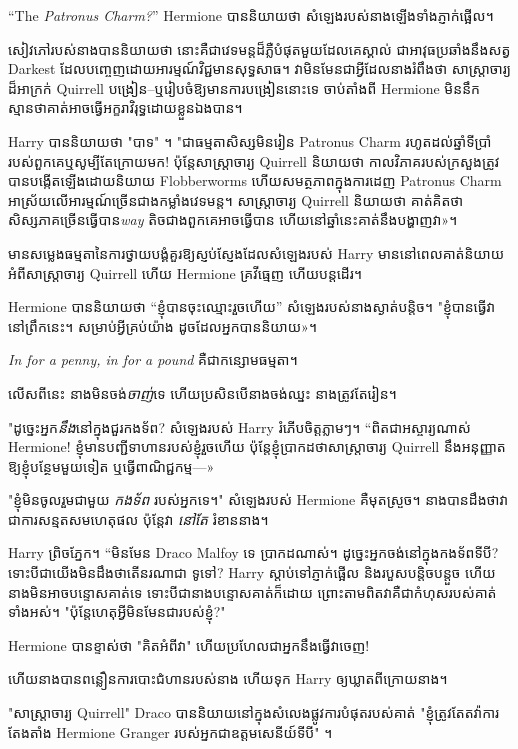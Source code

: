 {“The \emph{Patronus Charm?}” Hermione បាននិយាយថា សំឡេងរបស់នាងឡើងទាំងភ្ញាក់ផ្អើល។

សៀវភៅរបស់នាងបាននិយាយថា នោះគឺជាវេទមន្តដ៏ភ្លឺបំផុតមួយដែលគេស្គាល់ ជាអាវុធប្រឆាំងនឹងសត្វ Darkest ដែលបញ្ចេញដោយអារម្មណ៍វិជ្ជមានសុទ្ធសាធ។ វាមិនមែនជាអ្វីដែលនាងរំពឹងថា សាស្រ្តាចារ្យដ៏អាក្រក់ Quirrell បង្រៀន--ឬរៀបចំឱ្យមានការបង្រៀននោះទេ ចាប់តាំងពី Hermione មិននឹកស្មានថាគាត់អាចធ្វើអក្ខរាវិរុទ្ធដោយខ្លួនឯងបាន។

Harry បាននិយាយថា "បាទ" ។ "ជាធម្មតាសិស្សមិនរៀន Patronus Charm រហូតដល់ឆ្នាំទីប្រាំរបស់ពួកគេឬសូម្បីតែក្រោយមក! ប៉ុន្តែសាស្ត្រាចារ្យ Quirrell និយាយថា កាលវិភាគរបស់ក្រសួងត្រូវបានបង្កើតឡើងដោយនិយាយ Flobberworms ហើយសមត្ថភាពក្នុងការដេញ Patronus Charm អាស្រ័យលើអារម្មណ៍ច្រើនជាងកម្លាំងវេទមន្ត។ សាស្ត្រាចារ្យ Quirrell និយាយថា គាត់គិតថាសិស្សភាគច្រើនធ្វើបាន\emph{way} តិចជាងពួកគេអាចធ្វើបាន ហើយនៅឆ្នាំនេះគាត់នឹងបង្ហាញវា»។

មានសម្លេងធម្មតានៃការថ្វាយបង្គំគួរឱ្យស្ញប់ស្ញែងដែលសំឡេងរបស់ Harry មាននៅពេលគាត់និយាយអំពីសាស្រ្តាចារ្យ Quirrell ហើយ Hermione គ្រវីធ្មេញ ហើយបន្តដើរ។

Hermione បាននិយាយថា “ខ្ញុំបានចុះឈ្មោះរួចហើយ” សំឡេងរបស់នាងស្ងាត់បន្តិច។ "ខ្ញុំបានធ្វើវានៅព្រឹកនេះ។ សម្រាប់​អ្វី​គ្រប់​យ៉ាង ដូច​ដែល​អ្នក​បាន​និយាយ»។

\emph{In for a penny, in for a pound} គឺជាកន្សោមធម្មតា។

លើសពីនេះ នាងមិនចង់\emph{ចាញ់}ទេ ហើយប្រសិនបើនាងចង់ឈ្នះ នាងត្រូវតែរៀន។

"ដូច្នេះអ្នក\emph{នឹង}នៅក្នុងជួរកងទ័ព? សំឡេង​របស់ Harry រំភើប​ចិត្ត​ភ្លាមៗ។ “ពិតជាអស្ចារ្យណាស់ Hermione! ខ្ញុំ​មាន​បញ្ជី​ទាហាន​របស់​ខ្ញុំ​រួច​ហើយ ប៉ុន្តែ​ខ្ញុំ​ប្រាកដ​ថា​សាស្ត្រាចារ្យ Quirrell នឹង​អនុញ្ញាត​ឱ្យ​ខ្ញុំ​បន្ថែម​មួយ​ទៀត ឬ​ធ្វើ​ពាណិជ្ជកម្ម—»

"ខ្ញុំមិនចូលរួមជាមួយ \emph{ កងទ័ព} របស់អ្នកទេ។" សំឡេងរបស់ Hermione គឺមុតស្រួច។ នាង​បាន​ដឹង​ថា​វា​ជា​ការ​សន្មត​សម​ហេតុ​ផល ប៉ុន្តែ​វា \emph{នៅ​តែ} រំខាន​នាង។

Harry ព្រិចភ្នែក។ “មិនមែន Draco Malfoy ទេ ប្រាកដណាស់។ ដូច្នេះអ្នកចង់នៅក្នុងកងទ័ពទីបី? ទោះបីជាយើងមិនដឹងថាតើនរណាជា \emph{} ទូទៅ? Harry ស្តាប់ទៅភ្ញាក់ផ្អើល និងរបួសបន្តិចបន្តួច ហើយនាងមិនអាចបន្ទោសគាត់ទេ ទោះបីជានាងបន្ទោសគាត់ក៏ដោយ ព្រោះតាមពិតវាគឺជាកំហុសរបស់គាត់ទាំងអស់។ "ប៉ុន្តែហេតុអ្វីមិនមែនជារបស់ខ្ញុំ?"

Hermione បានខ្ទាស់ថា "គិតអំពីវា" ហើយប្រហែលជាអ្នកនឹងធ្វើវាចេញ!

ហើយ​នាង​បាន​ពន្លឿន​ការ​បោះ​ជំហាន​របស់​នាង ហើយ​ទុក Harry ឲ្យ​ឃ្លាត​ពី​ក្រោយ​នាង។

\later

"សាស្រ្តាចារ្យ Quirrell" Draco បាននិយាយនៅក្នុងសំលេងផ្លូវការបំផុតរបស់គាត់ "ខ្ញុំត្រូវតែតវ៉ាការតែងតាំង Hermione Granger របស់អ្នកជាឧត្តមសេនីយ៍ទីបី" ។

}
